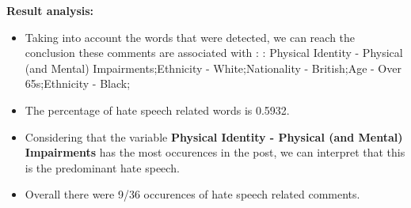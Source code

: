 \documentclass[11pt]{article}
\begin{document}
\textbf{\Large Result analysis:}

\begin{itemize}\item Taking into account the words that were detected, we can reach the conclusion these comments are associated with : : Physical Identity - Physical (and Mental) Impairments;Ethnicity - White;Nationality - British;Age - Over 65s;Ethnicity - Black;%

\item The percentage of hate speech related words is 0.5932.

\item Considering that the variable \textbf{Physical Identity - Physical (and Mental) Impairments} has the most occurences in the post, we can interpret that this is the predominant hate speech.

\item Overall there were 9/36 occurences of hate speech related comments.\end{itemize}
\end{document}
